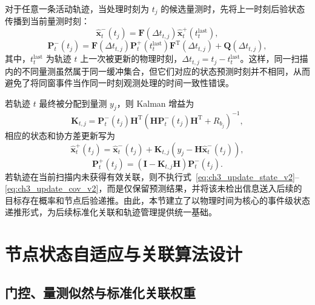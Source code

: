 \documentclass{xdupgthesis}
\begin{document}
对于任意一条活动轨迹，当处理时刻为 $t_j$ 的候选量测时，先将上一时刻后验状态传播到当前量测时刻：
\begin{equation}
	\hat{\mathbf x}^-_t(t_j)=\mathbf F(\Delta t_{t,j})\hat{\mathbf x}_{t}^{+}(t_t^{\mathrm{last}}),
	\label{eq:ch3_predict_state_event}
\end{equation}
\begin{equation}
	\mathbf P^-_t(t_j)=\mathbf F(\Delta t_{t,j})\mathbf P_t^{+}(t_t^{\mathrm{last}})\mathbf F^{\mathrm T}(\Delta t_{t,j})+\mathbf Q(\Delta t_{t,j}),
	\label{eq:ch3_predict_cov_event}
\end{equation}
其中，$t_t^{\mathrm{last}}$ 为轨迹 $t$ 上一次被更新的物理时刻，$\Delta t_{t,j}=t_j-t_t^{\mathrm{last}}$。这样，同一扫描内的不同量测虽然属于同一缓冲集合，但它们对应的状态预测时刻并不相同，从而避免了将同窗事件当作同一时刻观测处理的时间一致性错误。

若轨迹 $t$ 最终被分配到量测 $y_j$，则 Kalman 增益为
\begin{equation}
	\mathbf K_{t,j}=\mathbf P^-_t(t_j)\mathbf H^{\mathrm T}
	\left(\mathbf H\mathbf P^-_t(t_j)\mathbf H^{\mathrm T}+R_{b_j}\right)^{-1},
	\label{eq:ch3_K_v2}
\end{equation}
相应的状态和协方差更新写为
\begin{equation}
	\hat{\mathbf x}^+_t(t_j)=\hat{\mathbf x}^-_t(t_j)+\mathbf K_{t,j}\left(y_j-\mathbf H\hat{\mathbf x}^-_t(t_j)\right),
	\label{eq:ch3_update_state_v2}
\end{equation}
\begin{equation}
	\mathbf P^+_t(t_j)=\left(\mathbf I-\mathbf K_{t,j}\mathbf H\right)\mathbf P^-_t(t_j).
	\label{eq:ch3_update_cov_v2}
\end{equation}
若轨迹在当前扫描内未获得有效关联，则不执行式~\eqref{eq:ch3_update_state_v2}--\eqref{eq:ch3_update_cov_v2}，而是仅保留预测结果，并将该未检出信息送入后续的目标存在概率和节点后验递推。由此，本节建立了以物理时间为核心的事件级状态递推形式，为后续标准化关联和轨迹管理提供统一基础。

\section{节点状态自适应与关联算法设计}
\label{sec:ch3_association}

\subsection{门控、量测似然与标准化关联权重}
\label{subsec:ch3_assoc_weight}
\end{document}
